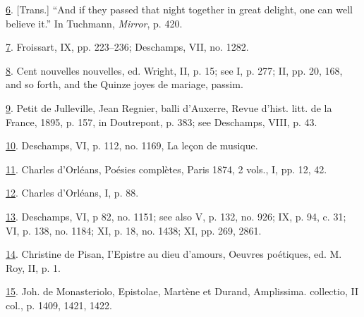 \protect\hypertarget{23_NOTES.xhtmlux5cux23id_1477}{\protect\hyperlink{11_Chapter_Four__THE_FORMS_OF_LOVE.xhtmlux5cux23id_1476}{6}}.
{[}Trans.{]} ``And if they passed that night together in great delight,
one can well believe it.'' In Tuchmann, \emph{Mirror}, p. 420.

\protect\hypertarget{23_NOTES.xhtmlux5cux23id_1475}{\protect\hyperlink{11_Chapter_Four__THE_FORMS_OF_LOVE.xhtmlux5cux23id_1474}{7}}.
Froissart, IX, pp. 223--236; Deschamps, VII, no. 1282.

\protect\hypertarget{23_NOTES.xhtmlux5cux23id_1473}{\protect\hyperlink{11_Chapter_Four__THE_FORMS_OF_LOVE.xhtmlux5cux23id_1472}{8}}.
Cent nouvelles nouvelles, ed. Wright, II, p. 15; see I, p. 277; II, pp.
20, 168, and so forth, and the Quinze joyes de mariage, passim.

\protect\hypertarget{23_NOTES.xhtmlux5cux23id_1471}{\protect\hyperlink{11_Chapter_Four__THE_FORMS_OF_LOVE.xhtmlux5cux23id_1470}{9}}.
Petit de Julleville, Jean Regnier, balli d'Auxerre, Revue d'hist. litt.
de la France, 1895, p. 157, in Doutrepont, p. 383; see Deschamps, VIII,
p. 43.

\protect\hypertarget{23_NOTES.xhtmlux5cux23id_1469}{\protect\hyperlink{11_Chapter_Four__THE_FORMS_OF_LOVE.xhtmlux5cux23id_1468}{10}}.
Deschamps, VI, p. 112, no. 1169, La leçon de musique.

\protect\hypertarget{23_NOTES.xhtmlux5cux23id_1467}{\protect\hyperlink{11_Chapter_Four__THE_FORMS_OF_LOVE.xhtmlux5cux23id_1466}{11}}.
Charles d'Orléans, Poésies complètes, Paris 1874, 2 vols., I, pp. 12,
42.

\protect\hypertarget{23_NOTES.xhtmlux5cux23id_1465}{\protect\hyperlink{11_Chapter_Four__THE_FORMS_OF_LOVE.xhtmlux5cux23id_1464}{12}}.
Charles d'Orléans, I, p. 88.

\protect\hypertarget{23_NOTES.xhtmlux5cux23id_1463}{\protect\hyperlink{11_Chapter_Four__THE_FORMS_OF_LOVE.xhtmlux5cux23id_1462}{13}}.
Deschamps, VI, p 82, no. 1151; see also V, p. 132, no. 926; IX, p. 94,
c. 31; VI, p. 138, no. 1184; XI, p. 18, no. 1438; XI, pp. 269, 2861.

\protect\hypertarget{23_NOTES.xhtmlux5cux23id_1461}{\protect\hyperlink{11_Chapter_Four__THE_FORMS_OF_LOVE.xhtmlux5cux23id_1460}{14}}.
Christine de Pisan, I'Epistre au dieu d'amours, Oeuvres poétiques, ed.
M. Roy, II, p. 1.

\protect\hypertarget{23_NOTES.xhtmlux5cux23id_1459}{\protect\hyperlink{11_Chapter_Four__THE_FORMS_OF_LOVE.xhtmlux5cux23id_1458}{15}}.
Joh. de Monasteriolo, Epistolae, Martène et Durand, Amplissima.
collectio, II col., p. 1409, 1421, 1422.

